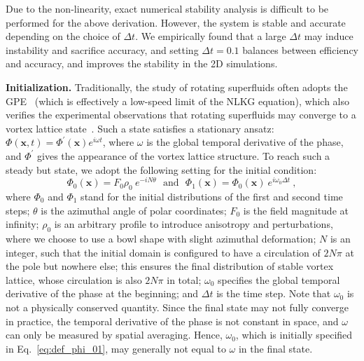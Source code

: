 \documentclass[10pt,journal,compsoc,twoside]{IEEEtran}
\newcommand{\bl}[1]{{\color{black}{#1}}}
\begin{document}
	Due to the non-linearity, exact numerical stability analysis is difficult to be performed for the above derivation.
	However, the system is stable and accurate depending on the choice of $\Delta t$.
	We empirically found that a large $\Delta t$ may induce instability and sacrifice accuracy, and setting $\Delta t$$=$$0.1$ balances between efficiency and accuracy, and improves the stability in the 2D simulations.
	
	\vspace{0.15cm}
	\noindent
	\textbf{Initialization.}
	Traditionally, the study of rotating superfluids often adopts the GPE~\cite{Tsubota_02} (which is effectively a low-speed limit of the NLKG equation), which also verifies the experimental observations that rotating superfluids may converge to a vortex lattice state~\cite{Abo-Shaeer_01}.
	Such a state satisfies a stationary ansatz: $\Phi(\mathbf{x},t)=\Phi^{'}(\mathbf{x}) e^{i\omega t}$, where $\omega$ is the global temporal derivative of the phase, and $\Phi^{'}$ gives the appearance of the vortex lattice structure.
	To reach such a steady but \bl{non-stationary} state, we adopt the following setting for the initial condition:
	\begin{equation}
		\Phi_{0}(\mathbf{x}) = F_0 \rho_0 \  e^{-i N \theta} \ \ \
		\mathrm{and} \ \ \
		\Phi_{1}(\mathbf{x}) = \Phi_{0}(\mathbf{x}) \ e^{i\omega_0 \Delta t}
		\ ,
		\label {eq:def_phi_01}
	\end{equation}
	where $\Phi_{0}$ and $\Phi_{1}$ stand for the initial distributions of the first and second time steps;
	$\theta$ is the azimuthal angle of polar coordinates;
	$F_0$ is the field magnitude at infinity;
	$\rho_0$ is an arbitrary profile to introduce anisotropy and perturbations, where we choose to use a bowl shape with slight azimuthal deformation;
	$N$ is an integer, such that the initial domain is configured to have a circulation of $2 N \pi$ at the pole but nowhere else;
	this ensures the final distribution of stable vortex lattice, whose circulation is also $2 N \pi$ in total;
	$\omega_0$ specifies the global temporal derivative of the phase at the beginning; and
	$\Delta t$ is the time step.
	Note that $\omega_0$ is not a physically conserved quantity. Since the final state may not fully converge in practice, the temporal derivative of the phase is not constant in space, and $\omega$ can only be measured by spatial averaging.
	Hence, $\omega_0$, which is initially specified in Eq.~\ref{eq:def_phi_01}, may generally not equal to $\omega$ in the final state.  
\end{document}
